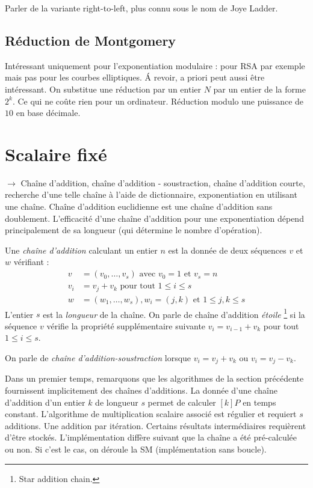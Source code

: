 Parler de la variante right-to-left, plus connu sous le nom de Joye Ladder.

\subsection{Réduction de Montgomery}
Intéressant uniquement pour l'exponentiation modulaire : pour RSA par exemple mais pas pour les courbes elliptiques. \'A revoir, a priori peut aussi être intéressant. On substitue une réduction par un entier $N$ par un entier de la forme $2^k$. Ce qui ne coûte rien pour un ordinateur. Réduction modulo une puissance de $10$ en base décimale.

\section{Scalaire fixé}
$\rightarrow$ Chaîne d'addition, chaîne d'addition - soustraction, chaîne d'addition courte, recherche d'une telle chaîne à l'aide de dictionnaire, exponentiation en utilisant une chaîne. Chaîne d'addition euclidienne est une chaîne d'addition sans doublement. L'efficacité d'une chaîne d'addition pour une exponentiation dépend principalement de sa longueur (qui détermine le nombre d'opération).

\begin{definition}
Une \emph{chaîne d'addition} calculant un entier $n$ est la donnée de deux séquences $v$ et $w$ vérifiant :
\begin{align}
v & = (v_0, \ldots, v_s) \text{ avec } v_0 = 1 \text{ et } v_s = n\\
v_i &= v_j + v_k \text{ pour tout } 1 \leq i \leq s\\
w &= (w_1, \ldots, w_s), w_i = (j, k) \text{ et } 1 \leq j, k \leq s
\end{align}
L'entier $s$ est la \emph{longueur} de la chaîne. On parle de chaîne d'addition \emph{étoile} \footnote{Star addition chain.} si la séquence $v$ vérifie la propriété supplémentaire suivante $v_i = v_{i-1} + v_k$ pour tout $1 \leq i \leq s$.

On parle de \emph{chaîne d'addition-soustraction} lorsque $v_i = v_j + v_k$ ou $v_i = v_j - v_k$.
\end{definition}

Dans un premier temps, remarquons que les algorithmes de la section précédente fournissent implicitement des chaînes d'additions. La donnée d'une chaîne d'addition d'un entier $k$ de longueur $s$ permet de calculer $[k]P$ en temps constant. L'algorithme de multiplication scalaire associé est régulier et requiert $s$ additions. Une addition par itération. Certains résultats intermédiaires requièrent d'être stockés. L'implémentation diffère suivant que la chaîne a été pré-calculée ou non. Si c'est le cas, on déroule la SM (implémentation sans boucle).


